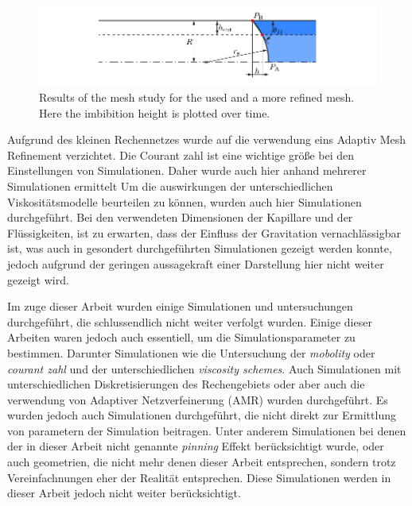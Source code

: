 \begin{figure}[h]
    \centering
    \includegraphics[width=.95\textwidth]{Pictures/CA_CALCMEthod2.pdf}
    \caption{Results of the mesh study for the used and a more refined mesh. Here the imbibition height is plotted over time.}
    \label{fig: Mesh_Study}
\end{figure}
Aufgrund des kleinen Rechennetzes wurde auf die verwendung eins Adaptiv Mesh Refinement verzichtet. 
Die Courant zahl ist eine wichtige größe bei den Einstellungen von Simulationen. Daher wurde auch hier anhand mehrerer Simulationen ermittelt 
Um die auswirkungen der unterschiedlichen Viskositätsmodelle beurteilen zu können, wurden auch hier Simulationen durchgeführt. 
Bei den verwendeten Dimensionen der Kapillare und der Flüssigkeiten, ist zu erwarten, dass der Einfluss der Gravitation vernachlässigbar ist, was auch in gesondert durchgeführten Simulationen gezeigt werden konnte, jedoch aufgrund der geringen aussagekraft einer Darstellung hier nicht weiter gezeigt wird. 

Im zuge dieser Arbeit wurden einige Simulationen und untersuchungen durchgeführt, die schlussendlich nicht weiter verfolgt wurden. Einige dieser Arbeiten waren jedoch auch essentiell, um die Simulationsparameter zu bestimmen. Darunter Simulationen wie die Untersuchung der \textit{mobolity} oder \textit{courant zahl} und der unterschiedlichen \textit{viscosity schemes}. Auch Simulationen mit unterschiedlichen Diskretisierungen des Rechengebiets oder aber auch die verwendung von Adaptiver Netzverfeinerung (AMR) wurden durchgeführt. Es wurden jedoch auch Simulationen durchgeführt, die nicht direkt zur Ermittlung von parametern der Simulation beitragen. Unter anderem Simulationen bei denen der in dieser Arbeit nicht genannte \textit{pinning} Effekt berücksichtigt wurde, oder auch geometrien, die nicht mehr denen dieser Arbeit entsprechen, sondern trotz Vereinfachnungen eher der Realität entsprechen. Diese Simulationen werden in dieser Arbeit jedoch nicht weiter berücksichtigt.  
